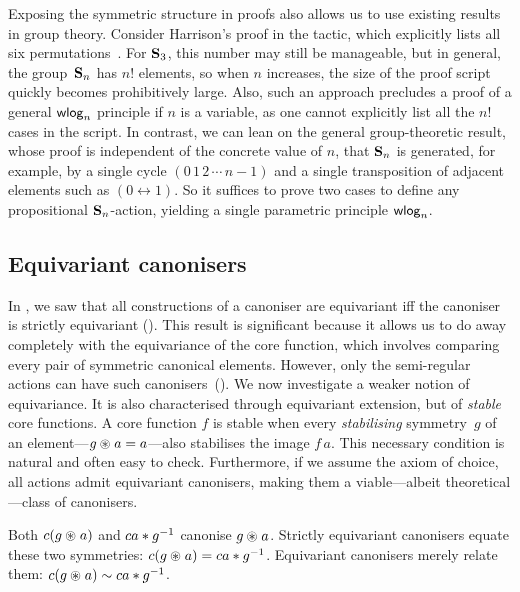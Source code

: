 Exposing the symmetric structure in proofs also allows us to use
existing results in group theory. Consider Harrison's proof in the
tactic, which explicitly lists all six
permutations~\cite{DBLP:conf/tphol/Harrison09}. For $\mathbf{S}_{3}$, this
number may still be manageable, but in general, the group~$\mathbf{S}_{n}$ has
$n!$ elements, so when $n$ increases, the size of the proof script
quickly becomes prohibitively large. Also, such an approach precludes
a proof of a general $\mathop{\mathsf{wlog}}\nolimits_n$ principle if $n$ is a variable, as one
cannot explicitly list all the $n!$ cases in the script. In contrast,
we can lean on the general group-theoretic result, whose proof is
independent of the concrete value of $n$, that $\mathbf{S}_{n}$ is generated,
for example, by a single cycle $(0 \, 1 \, 2 \, \cdots \, n - 1)$ and
a single transposition of adjacent elements such as $(0
\leftrightarrow 1)$. So it suffices to prove two cases
to define any propositional $\mathbf{S}_{n}$-action, yielding a single
parametric principle $\mathop{\mathsf{wlog}}\nolimits_n$.

\subsection{Equivariant canonisers}

In , we saw that all \WLOG{} constructions
of a canoniser are equivariant iff the canoniser is strictly
equivariant (). This result is significant because it allows us to do
away completely with the equivariance of the core function, which
involves comparing every pair of symmetric canonical elements.
However, only the semi-regular actions can
have such canonisers~(). We now investigate a weaker
notion of equivariance. It is also characterised through equivariant
extension, but of \emph{stable} core functions. A core function $f$ is
stable when every \emph{stabilising} symmetry~$g$ of an
element---$g\act a = a$---also stabilises the image $f\,a$. This
necessary condition is natural and often easy to check.  Furthermore,
if we assume the axiom of choice, all actions admit equivariant
canonisers, making them a viable---albeit theoretical---class of canonisers.

Both $\canoniser (g \act
a)$ and $\canoniser a \mul \inv g$ canonise $g \act a$. Strictly
equivariant canonisers equate these two symmetries:
$\canoniser (g \act a) = \canoniser a \mul \inv g$.
Equivariant canonisers merely relate
them: $\canoniser (g \act a) \stabeq{} \canoniser a \mul \inv g$.


